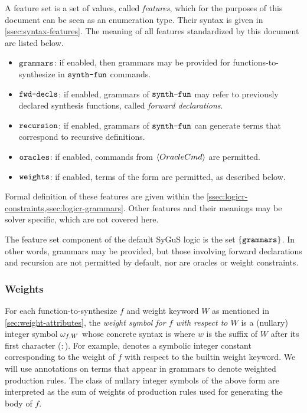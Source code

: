 \documentclass[english,a4paper,10pt]{article}
\begin{document}
A feature set is a set of values, called \emph{features},
which for the purposes of this document can be seen as an enumeration type.
Their syntax is given in \cref{ssec:syntax-features}.
The meaning of all features standardized by this document are listed below.
\begin{itemize}
\item $\texttt{grammars}$: if enabled, 
then grammars may be provided for functions-to-synthesize 
in $\texttt{synth-fun}$ commands.
\item $\texttt{fwd-decls}$: if enabled,
grammars of $\texttt{synth-fun}$ may refer to previously declared synthesis functions,
called \emph{forward declarations}.
\item $\texttt{recursion}$: if enabled,
grammars of $\texttt{synth-fun}$ can generate terms that correspond to recursive definitions.
\item $\texttt{oracles}$: if enabled,
commands from $\left\langle OracleCmd\right\rangle$ are permitted.
\item $\texttt{weights}$: if enabled,
terms of the form  are permitted,
as described below.
\end{itemize}
Formal definition of these features are given within the 
\cref{ssec:logicr-constraints,ssec:logicr-grammars}.
Other features and their meanings may be solver specific, 
which are not covered here.

The feature set component of the default SyGuS logic is the set $\{ \texttt{grammars} \}$.
In other words, grammars may be provided, but those involving
forward declarations and recursion are not permitted by default,
nor are oracles or weight constraints.

\subsubsection{Weights}
\label{sec:weight-semantics}
For each function-to-synthesize $f$ and weight keyword $W$
as mentioned in \cref{sec:weight-attributes},
the \emph{weight symbol for $f$ with respect to $W$} is a (nullary) integer symbol $\omega_{f,W}$
whose concrete syntax is  where $w$ is the
suffix of $W$ after its first character ($:$).
For example, 
denotes a symbolic integer constant corresponding to the weight of $f$
with respect to the builtin weight keyword.
We will use annotations on terms that appear in grammars
to denote weighted production rules.
The class of nullary integer symbols of the above form are
interpreted as the sum of weights of production rules used for generating the body of $f$.
\end{document}
